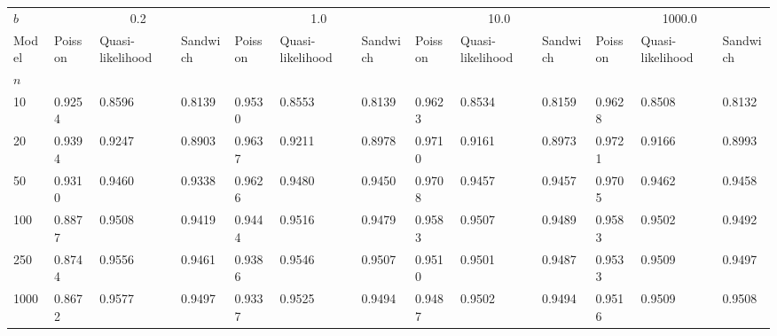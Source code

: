 \begin{tabular}{lllllllllllll}
\toprule
$b$ & \multicolumn{3}{c}{0.2} & \multicolumn{3}{c}{1.0} & \multicolumn{3}{c}{10.0} & \multicolumn{3}{c}{1000.0} \\
Model & Poisson & Quasi-likelihood & Sandwich & Poisson & Quasi-likelihood & Sandwich & Poisson & Quasi-likelihood & Sandwich & Poisson & Quasi-likelihood & Sandwich \\
$n$  &         &                  &          &         &                  &          &         &                  &          &         &                  &          \\
\midrule
10   &  0.9254 &           0.8596 &   0.8139 &  0.9530 &           0.8553 &   0.8139 &  0.9623 &           0.8534 &   0.8159 &  0.9628 &           0.8508 &   0.8132 \\
20   &  0.9394 &           0.9247 &   0.8903 &  0.9637 &           0.9211 &   0.8978 &  0.9710 &           0.9161 &   0.8973 &  0.9721 &           0.9166 &   0.8993 \\
50   &  0.9310 &           0.9460 &   0.9338 &  0.9626 &           0.9480 &   0.9450 &  0.9708 &           0.9457 &   0.9457 &  0.9705 &           0.9462 &   0.9458 \\
100  &  0.8877 &           0.9508 &   0.9419 &  0.9444 &           0.9516 &   0.9479 &  0.9583 &           0.9507 &   0.9489 &  0.9583 &           0.9502 &   0.9492 \\
250  &  0.8744 &           0.9556 &   0.9461 &  0.9386 &           0.9546 &   0.9507 &  0.9510 &           0.9501 &   0.9487 &  0.9533 &           0.9509 &   0.9497 \\
1000 &  0.8672 &           0.9577 &   0.9497 &  0.9337 &           0.9525 &   0.9494 &  0.9487 &           0.9502 &   0.9494 &  0.9516 &           0.9509 &   0.9508 \\
\bottomrule
\end{tabular}
